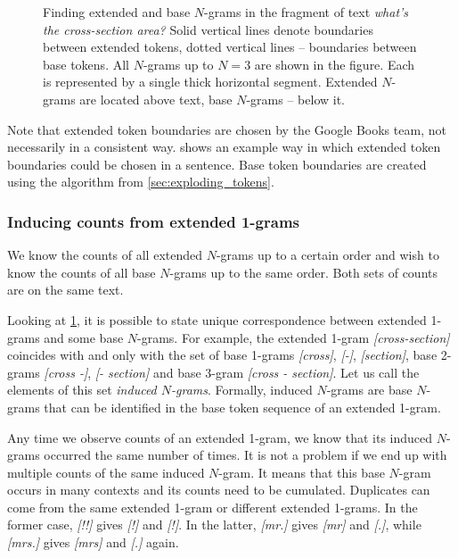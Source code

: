 \documentclass[draft]{IIBproject}
\DeclareRobustCommand{\ngram}[1]{\emph{[#1]}}
\begin{document}
\begin{figure}[h]
\caption{\label{fig:extended_and_base_ngrams}Finding extended and base $N$-grams in the fragment of text \emph{what's the \mbox{cross-section} area?} Solid vertical lines denote boundaries between extended tokens, dotted vertical lines -- boundaries between base tokens. All $N$-grams up to $N=3$ are shown in the figure. Each is represented by a single thick horizontal segment. Extended $N$-grams are located above text, base $N$-grams -- below it.}
\end{figure}

Note that extended token boundaries are chosen by the Google Books team, not necessarily in a consistent way.  shows an example way in which extended token boundaries could be chosen in a sentence. Base token boundaries are created using the algorithm from \cref{sec:exploding_tokens}.

\subsubsection{Inducing counts from extended 1-grams}

We know the counts of all extended $N$-grams up to a certain order and wish to know the counts of all base $N$-grams up to the same order. Both sets of counts are on the same text.

Looking at \cref{fig:extended_and_base_ngrams}, it is possible to state unique correspondence between extended 1-grams and some base $N$-grams. For example, the extended 1-gram \ngram{\mbox{cross-section}} coincides with and only with the set of base 1-grams \ngram{cross}, \ngram{-}, \ngram{section}, base 2-grams \ngram{cross -}, \ngram{- section} and base 3-gram \ngram{cross - section}. Let us call the elements of this set \emph{induced $N$-grams}. Formally, induced $N$-grams are base $N$-grams that can be identified in the base token sequence of an extended 1-gram.

Any time we observe counts of an extended 1-gram, we know that its induced $N$-grams occurred the same number of times. It is not a problem if we end up with multiple counts of the same induced $N$-gram. It means that this base $N$-gram occurs in many contexts and its counts need to be cumulated. Duplicates can come from the same extended 1-gram or different extended 1-grams. In the former case, \ngram{!!} gives \ngram{!} and \ngram{!}. In the latter, \ngram{mr.} gives \ngram{mr} and \ngram{.}, while \ngram{mrs.} gives \ngram{mrs} and \ngram{.} again.
\end{document}
